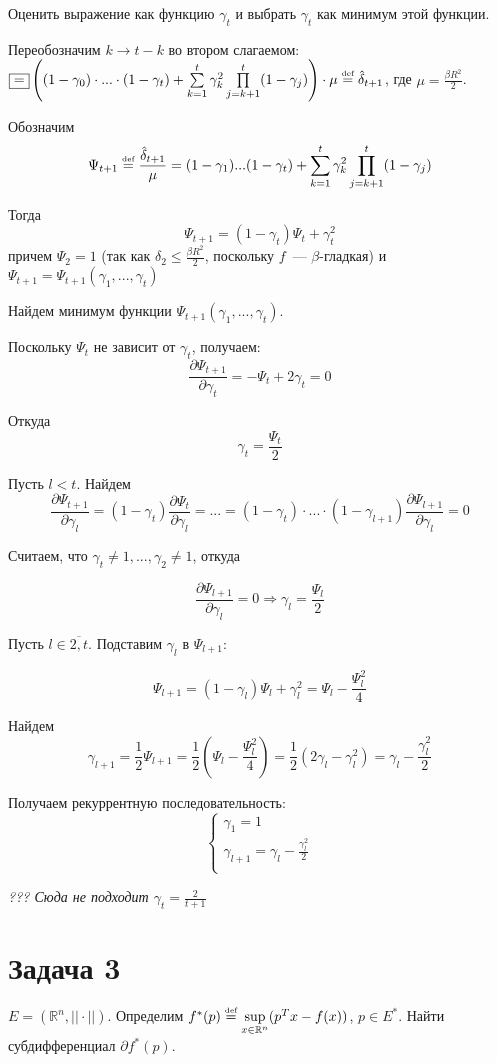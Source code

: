 \documentclass[a4paper]{article}
\def\eqdef{\overset{\mbox{\tiny def}}{=}}
\begin{document}
Оценить выражение как функцию $\gamma_t$ и выбрать $\gamma_t$ как минимум этой функции.

Переобозначим $k\to t-k$ во втором слагаемом: $\boxed{=}\left((1-\gamma_0)\cdot...\cdot(1-\gamma_t)+\sum\limits_{k=1}^t\gamma_k^2\prod\limits_{j=k+1}^t(1-\gamma_j)\right)\cdot \mu\eqdef \hat{\delta}_{t+1}$, где $\mu=\frac{\beta R^2}{2}$.

Обозначим
$$\Psi_{t+1}\eqdef \frac{\hat{\delta}_{t+1}}{\mu}=(1-\gamma_1)...(1-\gamma_t)+\sum\limits_{k=1}^t\gamma_k^2\prod\limits_{j=k+1}^{t}(1-\gamma_j)$$

Тогда $$\Psi_{t+1}=(1-\gamma_t)\Psi_t+\gamma_t^2$$
причем $\Psi_2=1$ (так как $\delta_2\leqslant \frac{\beta R^2}{2}$, поскольку $f$~--- $\beta$-гладкая) и $\Psi_{t+1}=\Psi_{t+1}(\gamma_1,...,\gamma_t)$

Найдем минимум функции $\Psi_{t+1}(\gamma_1,...,\gamma_t)$.

Поскольку $\Psi_t$ не зависит от $\gamma_t$, получаем:
$$\frac{\partial \Psi_{t+1}}{\partial \gamma_t}=-\Psi_t+2\gamma_t=0$$

Откуда $$\gamma_t=\frac{\Psi_t}{2}$$

Пусть $l<t$. Найдем $$\frac{\partial \Psi_{t+1}}{\partial \gamma_l}=(1-\gamma_t)\frac{\partial \Psi_{t}}{\partial \gamma_l}=...=(1-\gamma_t)\cdot...\cdot(1-\gamma_{l+1})\frac{\partial \Psi_{l+1}}{\partial \gamma_l}=0$$

Считаем, что $\gamma_t\neq 1,...,\gamma_2\neq 1$, откуда

$$\frac{\partial \Psi_{l+1}}{\partial \gamma_l}=0\Rightarrow \gamma_l=\frac{\Psi_l}{2}$$

Пусть $l\in \overline{2,t}$. Подставим $\gamma_l$ в $\Psi_{l+1}$:

$$\Psi_{l+1}=(1-\gamma_l)\Psi_{l}+\gamma_l^2=\Psi_l-\frac{\Psi_l^2}{4}$$

Найдем $$\gamma_{l+1}=\frac{1}{2}\Psi_{l+1}=\frac{1}{2}(\Psi_l-\frac{\Psi_l^2}{4})=\frac{1}{2}(2\gamma_l-\gamma_l^2)=\gamma_l-\frac{\gamma_l^2}{2}$$

Получаем рекуррентную последовательность:
$$
\begin{cases}
\gamma_1 = 1\\
\gamma_{l+1}=\gamma_l-\frac{\gamma_l^2}{2}\\
\end{cases}
$$

{\em ??? Сюда не подходит $\gamma_t=\frac{2}{t+1}$}
\section*{Задача 3}
$E=(\mathbb{R}^n,||\cdot||)$. Определим $f^*(p)\eqdef\sup\limits_{x\in\mathbb{R}^n}(p^Tx-f(x))$, $p\in E^*$. Найти субдифференциал $\partial f^*(p)$.
\end{document}
